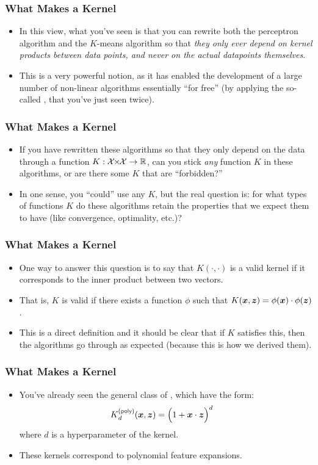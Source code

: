 \documentclass[trans]{beamer}
\begin{document}
\begin{frame}
  \frametitle{What Makes a Kernel}
\begin{itemize}
\item 
In this view, what you've seen  is that
you can rewrite both the perceptron algorithm and the $K$-means
algorithm so that \emph{they only ever depend on kernel products
  between data points, and never on the actual datapoints themselves}.
\item
This is a very powerful notion, as it has enabled the development of a
large number of non-linear algorithms essentially ``for free'' (by
applying the so-called , that you've just seen
twice).
\end{itemize}
\end{frame}

\begin{frame}
  \frametitle{What Makes a Kernel}
\begin{itemize}
\item 
  If you have rewritten these
algorithms so that they only depend on the data through a function $K
: \cX \times \cX \fto \R$, can you stick \emph{any} function $K$ in
these algorithms, or are there some $K$ that are ``forbidden?'' 
\item In
one sense, you ``could'' use any $K$, but the real question is: for
what types of functions $K$ do these algorithms retain the properties
that we expect them to have (like convergence, optimality, etc.)?
\end{itemize}
\end{frame}

\begin{frame}
  \frametitle{What Makes a Kernel}
\begin{itemize}
\item 
One way to answer this question is to say that $K(\cdot,\cdot)$ is a
valid kernel if it corresponds to the inner product between two
vectors.
\item  That is, $K$ is valid if there exists a function $\phi$ such
that $K({\boldsymbol{x}},{\boldsymbol{z}}) = \phi({\boldsymbol{x}}) \cdot \phi({\boldsymbol{z}})$. 
\item This is a direct
definition and it should be clear that if $K$ satisfies this, then the
algorithms go through as expected (because this is how we derived
them).
\end{itemize}
\end{frame}

\begin{frame}
  \frametitle{What Makes a Kernel}
\begin{itemize}
\item 
You've already seen the general class of ,
which have the form:
%
\begin{align}
K\xth{poly}_d(\vx,\vz) &= \Big( 1 + \dotp{\vx}{\vz} \Big)^d
\end{align}
%
where $d$ is a hyperparameter of the kernel.  
\item These kernels correspond
to polynomial feature expansions.
\end{itemize}
\end{frame}
\end{document}
